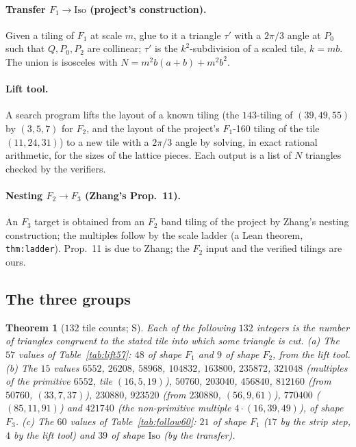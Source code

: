 \documentclass[11pt,reqno]{amsart}
\theoremstyle{plain}
\newtheorem{theorem}{Theorem}[section]
\theoremstyle{definition}
\newcommand{\sS}{\textup{\textsf{S}}}
\begin{document}
\paragraph{Transfer $F_1\to\mathrm{Iso}$ (project's construction).} Given a tiling of $F_1$ at scale $m$, glue to it
a triangle $\tau'$ with a $2\pi/3$ angle at $P_0$ such that $Q,P_0,P_2$ are collinear; $\tau'$ is the $k^2$-subdivision of
a scaled tile, $k=mb$. The union is isosceles with $N=m^2b(a+b)+m^2b^2$.
\paragraph{Lift tool.} A search program lifts the layout of a known tiling (the $143$-tiling of $(39,49,55)$
by $(3,5,7)$ for $F_2$, and the layout of the project's $F_1$-160 tiling of the tile $(11,24,31)$) to a new tile with a
$2\pi/3$ angle by solving, in exact rational arithmetic, for the sizes of the lattice pieces. Each output is a list
of $N$ triangles checked by the verifiers.
\paragraph{Nesting $F_2\to F_3$ (Zhang's Prop.~11).} An $F_3$ target is obtained from an $F_2$ band tiling of the
project by Zhang's nesting construction; the multiples follow by the scale ladder (a Lean theorem, \texttt{thm:ladder}).
Prop.~11 is due to Zhang; the $F_2$ input and the verified tilings are ours.

\subsection{The three groups}\label{sub:til:groups}
\begin{theorem}[$132$ tile counts; \sS]\label{thm:tiles132}
Each of the following $132$ integers is the number of triangles congruent to the stated tile into which some
triangle is cut. (a) The $57$ values of Table~\ref{tab:lift57}: $48$ of shape $F_1$ and $9$ of shape $F_2$, from the lift tool.
(b) The $15$ values $6552$, $26208$, $58968$, $104832$, $163800$, $235872$, $321048$ (multiples of the primitive $6552$,
tile $(16,5,19)$), $50760$, $203040$, $456840$, $812160$ (from $50760$, $(33,7,37)$), $230880$, $923520$ (from $230880$,
$(56,9,61)$), $770400$ ($(85,11,91)$) and $421740$ (the non-primitive multiple $4\cdot(16,39,49)$), of shape $F_3$.
(c) The $60$ values of Table~\ref{tab:follow60}: $21$ of shape $F_1$ ($17$ by the strip step, $4$ by the lift tool) and
$39$ of shape $\mathrm{Iso}$ (by the transfer).
\end{theorem}
\end{document}
